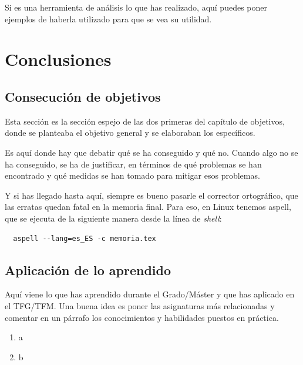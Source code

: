 \documentclass[a4paper, 12pt]{book}
\begin{document}
Si es una herramienta de análisis lo que has realizado, aquí puedes poner ejemplos de haberla utilizado para que se vea su utilidad.



\cleardoublepage
\chapter{Conclusiones}
\label{chap:conclusiones}


\section{Consecución de objetivos}
\label{sec:consecucion-objetivos}

Esta sección es la sección espejo de las dos primeras del capítulo de objetivos, donde se planteaba el objetivo general y se elaboraban los específicos.

Es aquí donde hay que debatir qué se ha conseguido y qué no. 
Cuando algo no se ha conseguido, se ha de justificar, en términos de qué problemas se han encontrado y qué medidas se han tomado para mitigar esos problemas.

Y si has llegado hasta aquí, siempre es bueno pasarle el corrector ortográfico, que las erratas quedan fatal en la memoria final.
Para eso, en Linux tenemos aspell, que se ejecuta de la siguiente manera desde la línea de \emph{shell}:

\begin{verbatim}
  aspell --lang=es_ES -c memoria.tex
\end{verbatim}

\section{Aplicación de lo aprendido}
\label{sec:aplicacion}

Aquí viene lo que has aprendido durante el Grado/Máster y que has aplicado en el TFG/TFM.
Una buena idea es poner las asignaturas más relacionadas y comentar en un párrafo los conocimientos y habilidades puestos en práctica.

\begin{enumerate}
  \item a
  \item b
\end{enumerate}
\end{document}
